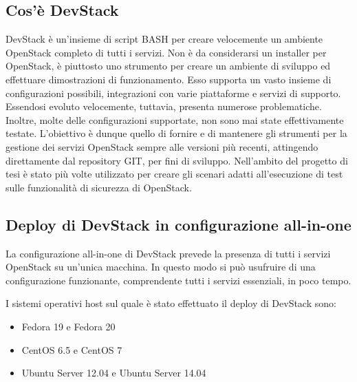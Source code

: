 \documentclass[../main.tex]{subfiles}
\begin{document}
\subsection{Cos'è DevStack}
DevStack è un'insieme di script BASH per creare velocemente un ambiente OpenStack completo di tutti i servizi. Non è da considerarsi un installer per OpenStack, è piuttosto uno strumento per creare un ambiente di sviluppo ed effettuare dimostrazioni di funzionamento.
Esso supporta un vasto insieme di configurazioni possibili, integrazioni con varie piattaforme e servizi di supporto.
Essendosi evoluto velocemente, tuttavia, presenta numerose problematiche. Inoltre, molte delle configurazioni supportate, non sono mai state effettivamente testate.
L'obiettivo è dunque quello di fornire e di mantenere gli strumenti per la gestione dei servizi OpenStack sempre alle versioni più recenti, attingendo direttamente dal repository GIT, per fini di sviluppo.
Nell'ambito del progetto di tesi è stato più volte utilizzato per creare gli scenari adatti all'esecuzione di test sulle funzionalità di sicurezza di OpenStack.
\subsection{Deploy di DevStack in configurazione all-in-one}
La configurazione all-in-one di DevStack prevede la presenza di tutti i servizi OpenStack su un'unica macchina.
In questo modo si può usufruire di una configurazione funzionante, comprendente tutti i servizi essenziali, in poco tempo.

I sistemi operativi host sul quale è stato effettuato il deploy di DevStack sono:
\begin{itemize}
\item Fedora 19 e Fedora 20
\item CentOS 6.5 e CentOS 7
\item Ubuntu Server 12.04 e Ubuntu Server 14.04
\end{itemize}
\end{document}
